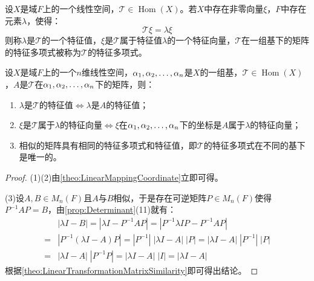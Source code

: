 \begin{definition}
	设$X$是域$F$上的一个线性空间，$\mathcal{T}\in\operatorname{Hom}(X)$。若$X$中存在非零向量$\xi$，$F$中存在元素$\lambda$，使得：
	\begin{equation*}
		\mathcal{T}\xi=\lambda\xi
	\end{equation*}
	则称$\lambda$是$\mathcal{T}$的一个特征值，$\xi$是$\mathcal{T}$属于特征值$\lambda$的一个特征向量，$\mathcal{T}$在一组基下的矩阵的特征多项式被称为$\mathcal{T}$的特征多项式。
\end{definition}
\begin{theorem}\label{theo:LinearlyTransformationMatrixEigen}
	设$X$是域$F$上的一个$n$维线性空间，$\alpha_1, \alpha_2, \dots, \alpha_{n}$是$X$的一组基，$\mathcal{T}\in\operatorname{Hom}(X)$，$A$是$\mathcal{T}$在$\alpha_1, \alpha_2, \dots, \alpha_{n}$下的矩阵，则：
	\begin{enumerate}
		\item $\lambda$是$\mathcal{T}$的特征值$\iff\lambda$是$A$的特征值；
		\item $\xi$是$\mathcal{T}$属于$\lambda$的特征向量$\iff\xi$在$\alpha_1, \alpha_2, \dots, \alpha_{n}$下的坐标是$A$属于$\lambda$的特征向量；
		\item 相似的矩阵具有相同的特征多项式和特征值，即$\mathcal{T}$的特征多项式在不同的基下是唯一的。
	\end{enumerate}
\end{theorem}
\begin{proof}
	(1)(2)由\cref{theo:LinearMappingCoordinate}立即可得。\par
	(3)设$A,B\in M_{n}(F)$且$A$与$B$相似，于是存在可逆矩阵$P\in M_{n}(F)$使得$P^{-1}AP=B$，由\cref{prop:Determinant}(11)就有：
	\begin{align*}
		&|\lambda I-B|=|\lambda I-P^{-1}AP|=|P^{-1}\lambda IP-P^{-1}AP| \\
		=&|P^{-1}(\lambda I-A)P|=|P^{-1}|\;|\lambda I-A|\;|P|=|\lambda I-A|\;|P^{-1}|\;|P| \\
		=&|\lambda I-A|\;|P^{-1}P|=|\lambda I-A|\;|I|=|\lambda I-A|
	\end{align*}
	根据\cref{theo:LinearTransformationMatrixSimilarity}即可得出结论。
\end{proof}
